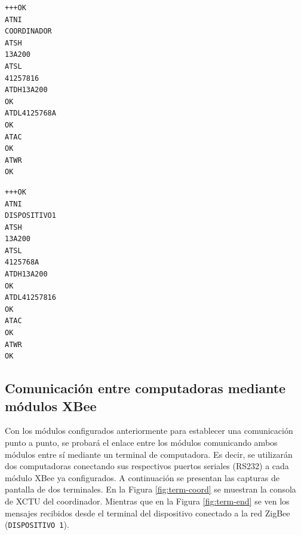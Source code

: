 \documentclass[11pt,oneside,spanish,a4paper]{article}
\begin{document}
\noindent\begin{minipage}{.45\textwidth}
\begin{lstlisting}[emph={+++,ATWR,ATAC,ATNI,ATSH,ATSL,ATDH13A200,ATDL4125768A},
emphstyle={\color{blue}}, caption={Destino del coordinador.},label=code:coord-dest]
+++OK
ATNI
COORDINADOR
ATSH
13A200
ATSL
41257816
ATDH13A200
OK
ATDL4125768A
OK
ATAC
OK
ATWR
OK
\end{lstlisting}  
\end{minipage}\hfill
\begin{minipage}{.45\textwidth}
\begin{lstlisting}[emph={+++,ATWR,ATAC,ATSH,ATNI,ATSL,ATDH13A200,ATDL41257816},
emphstyle={\color{blue}}, caption={Destino del coordinador.},label=code:end-dest]
+++OK
ATNI
DISPOSITIVO1
ATSH
13A200
ATSL
4125768A
ATDH13A200
OK
ATDL41257816
OK
ATAC
OK
ATWR
OK
\end{lstlisting}  
\end{minipage}

\subsection{Comunicación entre computadoras mediante módulos XBee}

Con los módulos configurados anteriormente para establecer una
comunicación punto a punto, se probará el enlace entre los módulos
comunicando ambos módulos entre sí mediante un terminal de
computadora. Es decir, se utilizarán dos computadoras conectando sus
respectivos puertos seriales (RS232) a cada módulo XBee ya
configurados. A continuación se presentan las capturas de pantalla de
dos terminales. En la Figura \ref{fig:term-coord} se muestran la
consola de XCTU del coordinador. Mientras que en la Figura
\ref{fig:term-end} se ven los mensajes recibidos desde el terminal del
dispositivo conectado a la red ZigBee (\texttt{DISPOSITIVO 1}).
\end{document}
